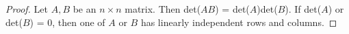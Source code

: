 
\begin{proof}Let $A,B$ be an $n\times n$ matrix. Then det($AB$) = det($A$)det($B$). If det($A$) or det($B$) = $0$, then one of $A$ or $B$ has linearly independent rows and columns.
\end{proof}